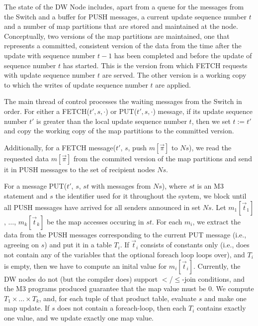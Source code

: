 
The state of the DW Node includes, apart from a queue 
for the messages from the Switch and a buffer for PUSH messages, a
current update sequence number $t$ and a number
of map partitions that are stored and maintained at the node.
Conceptually, two versions of the map partitions are maintained,
one that represents a committed, consistent version of the data from the time after the
update with sequence number $t-1$ has been completed and before the update
of sequence number $t$ has started. This is the version from which FETCH
requests with update sequence number $t$ are served. The other
version is a working copy to which the writes of update sequence number
$t$ are applied.

The main thread of control processes the waiting messages from the Switch
in order.
For either a FETCH($t', s, \cdot$) or PUT($t', s,\cdot$) message, if its
update sequence number $t'$ is greater
than the local update sequence number $t$, then we set $t := t'$
and copy the working copy of the map partitions to the committed version.

Additionally,
for a FETCH message($t'$, $s$, push $m[\vec{\pi}]$ to $Ns$),
we read the requested data $m[\vec{\pi}]$ from the commited version of
the map partitions and send it in PUSH messages to the set of recipient
nodes $Ns$.

For a message PUT($t'$, $s$, $st$ with messages from $Ns$), where $st$
is an M3 statement and $s$ the identifier used for it throughout the 
system, we block until all PUSH messages have arrived for all
senders announced in set $Ns$.
Let $m_1[\vec{t}_1]$, $\dots$, $m_k[\vec{t}_k]$ be the map accesses occuring in
$st$. For each $m_i$, 
we extract the data from the PUSH messages corresponding
to the current PUT message (i.e., agreeing on $s$) and put it in a table $T_i$.
If $\vec{t}_i$ consists of constants only (i.e., does not contain any
of the variables that the optional foreach loop loops over), and $T_i$ is
empty, then we have to compute an inital value for $m_i[\vec{t}_i]$.
Currently, the DW nodes do not (but the compiler does) support $<$/$\le$-join
conditions, and the M3 programs produced guarantee that the map value must be
0.  We compute
$T_1 \times \dots \times T_k$, and, for each tuple of that product table,
evaluate $s$ and make one map update.
If $s$ does not contain a foreach-loop, then each $T_i$ contains exactly
one value, and we update exactly one map value.


